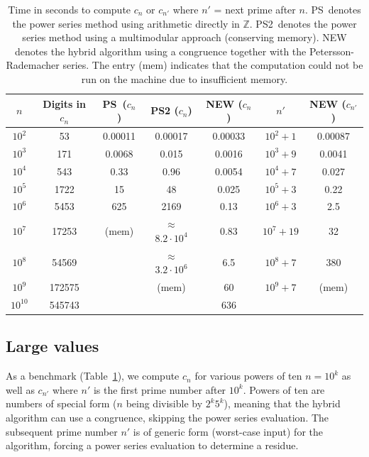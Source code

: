 \documentclass{amsart}
\theoremstyle{definition}
\theoremstyle{remark}
\begin{document}
\begin{table}
\begin{center}
\caption{Time in seconds to compute $c_n$ or $c_{n'}$ where $n'$ = next prime after $n$. PS\ denotes
the power series method using arithmetic directly in $\mathbb{Z}$. PS2\ denotes the power series method
using a multimodular approach (conserving memory). NEW denotes the
hybrid algorithm using a congruence together with the Petersson-Rademacher series.
The entry (mem) indicates that the computation could not be run on the
machine due to insufficient memory.}
\label{tab:timings}
\renewcommand{\baselinestretch}{1.25}
\begin{small}
\begin{tabular}{ c c | c c c | c c } 
$n$  & Digits in $c_n$ & PS\ ($c_n$) & PS2 ($c_n$) & NEW ($c_n$) & $n'$ & NEW ($c_{n'}$)\\ \hline
$10^2$ & 53     & 0.00011  & 0.00017    &   0.00033 & $10^2 + 1$ & 0.00087 \\
$10^3$ & 171    & 0.0068   & 0.015      &   0.0016  & $10^3 + 9$ & 0.0041 \\
$10^4$ & 543    & 0.33     & 0.96       &   0.0054  & $10^4 + 7$ & 0.027 \\
$10^5$ & 1722   & 15       & 48         &   0.025   & $10^5 + 3$ & 0.22 \\
$10^6$ & 5453   & 625      & 2169       &   0.13    & $10^6 + 3$ & 2.5 \\
$10^7$ & 17253  & (mem)       & $\approx$ $8.2 \cdot 10^4$      &   0.83    & $10^7 + 19\!\!\!\!$ & 32 \\
$10^8$ & 54569  &          & $\approx$ $3.2\cdot 10^6$           &   6.5     & $10^8 + 7$ & 380 \\
$10^9$ & 172575 &          & (mem)        &   60      & $10^9 + 7$ & (mem) \\
$10^{10}$ & 545743  &      &            &   636     & & \\
\end{tabular}
\end{small}
\end{center}
\end{table}

\subsection{Large values}

As a benchmark (Table~\ref{tab:timings}), we compute $c_n$ for various powers of ten $n = 10^k$
as well as $c_{n'}$ where $n'$ is the first prime number
after $10^k$. Powers of ten are numbers of special form
($n$ being divisible by $2^k 5^k$),
meaning that the hybrid algorithm can use a congruence,
skipping the power series evaluation.
The subsequent prime number $n'$ is of generic form (worst-case input) for the algorithm,
forcing a power series evaluation to determine a residue.
\end{document}
